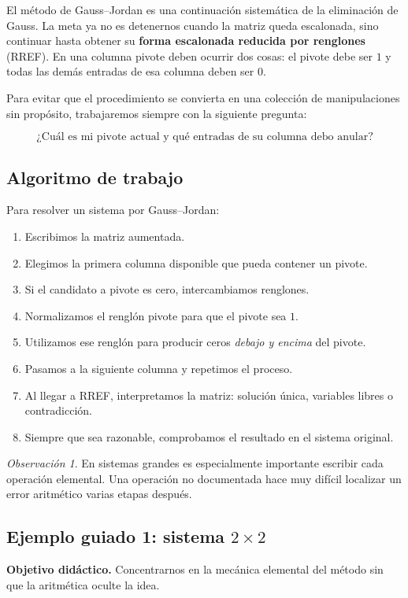 \documentclass[12pt]{article}
\theoremstyle{remark}
\newtheorem{observacion}[definicion]{Observación}
\begin{document}
El método de Gauss--Jordan es una continuación sistemática de la eliminación de Gauss. La meta ya no
es detenernos cuando la matriz queda escalonada, sino continuar hasta obtener su \textbf{forma
escalonada reducida por renglones} (RREF). En una columna pivote deben ocurrir dos cosas: el pivote
debe ser \(1\) y todas las demás entradas de esa columna deben ser \(0\).

Para evitar que el procedimiento se convierta en una colección de manipulaciones sin propósito,
trabajaremos siempre con la siguiente pregunta:

\[
\boxed{\text{¿Cuál es mi pivote actual y qué entradas de su columna debo anular?}}
\]

\subsection*{Algoritmo de trabajo}

Para resolver un sistema por Gauss--Jordan:

\begin{enumerate}
\item Escribimos la matriz aumentada.
\item Elegimos la primera columna disponible que pueda contener un pivote.
\item Si el candidato a pivote es cero, intercambiamos renglones.
\item Normalizamos el renglón pivote para que el pivote sea \(1\).
\item Utilizamos ese renglón para producir ceros \emph{debajo y encima} del pivote.
\item Pasamos a la siguiente columna y repetimos el proceso.
\item Al llegar a RREF, interpretamos la matriz: solución única, variables libres o contradicción.
\item Siempre que sea razonable, comprobamos el resultado en el sistema original.
\end{enumerate}

\begin{observacion}
En sistemas grandes es especialmente importante escribir cada operación elemental. Una operación no
documentada hace muy difícil localizar un error aritmético varias etapas después.
\end{observacion}

\subsection*{Ejemplo guiado 1: sistema $2\times2$}
\textbf{Objetivo didáctico.} Concentrarnos en la mecánica elemental del método sin que la aritmética oculte la idea.
\end{document}
